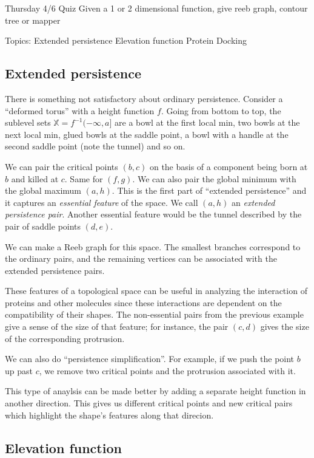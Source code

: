 \documentclass[12pt,oneside,openright]{memoir}
\begin{document}
\mainmatter

Thursday 4/6 Quiz
Given a 1 or 2 dimensional function, give reeb graph, contour tree or mapper

Topics:
Extended persistence
Elevation function
Protein Docking

\subsection{Extended persistence}

There is something not satisfactory about ordinary persistence. Consider a ``deformed torus'' with a height function $f$. Going from bottom to top, the sublevel sets $\mathbb{X}=f^{-1}(-\infty,a]$ are a bowl at the first local min, two bowls at the next local min, glued bowls at the saddle point, a bowl with a handle at the second saddle point (note the tunnel) and so on.

We can pair the critical points $(b,c)$ on the basis of a component being born at $b$ and killed at $c$. Same for $(f,g)$. We can also pair the global minimum with the global maximum $(a,h)$. This is the first part of ``extended persistence'' and it captures an \emph{essential feature} of the space. We call $(a,h)$ an \emph{extended persistence pair}. Another essential feature would be the tunnel described by the pair of saddle points $(d,e)$.

We can make a Reeb graph for this space. The smallest branches correspond to the ordinary pairs, and the remaining vertices can be associated with the extended persistence pairs.

These features of a topological space can be useful in analyzing the interaction of proteins and other molecules since these interactions are dependent on the compatibility of their shapes. The non-essential pairs from the previous example give a sense of the size of that feature; for instance, the pair $(c,d)$ gives the size of the corresponding protrusion.

We can also do ``persistence simplification''. For example, if we push the point $b$ up past $c$, we remove two critical points and the protrusion associated with it.

This type of anaylsis can be made better by adding a separate height function in another direction. This gives us different critical points and new critical pairs which highlight the shape's features along that direcion.

\subsection{Elevation function}
\end{document}
